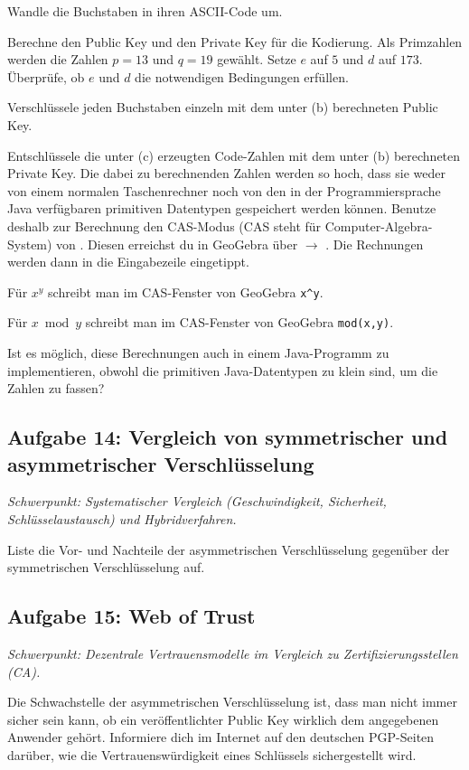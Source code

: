 \begin{compactenum}[a)]
\item Wandle die Buchstaben in ihren ASCII-Code um. 
\item Berechne den Public Key und den Private Key für die Kodierung. Als
Primzahlen werden die Zahlen $p=13$ und $q=19$ gewählt. Setze $e$ auf $5$ und $d$
auf $173$. Überprüfe, ob $e$ und $d$ die notwendigen Bedingungen erfüllen.
\item Verschlüssele jeden Buchstaben einzeln mit dem unter (b) berechneten Public
Key.
\item Entschlüssele die unter (c) erzeugten Code-Zahlen mit dem unter (b)
berechneten Private Key. Die dabei zu berechnenden Zahlen werden so hoch, dass
sie weder von einem normalen Taschenrechner noch von den in der
Programmiersprache Java verfügbaren primitiven Datentypen gespeichert werden
können. Benutze deshalb zur Berechnung den CAS-Modus (CAS steht für
Computer-Algebra-System) von . Diesen erreichst du in
GeoGebra über  $\rightarrow$ . Die
Rechnungen werden dann in die Eingabezeile eingetippt.

Für $x^y$ schreibt man im CAS-Fenster von GeoGebra \lstinline|x^y|.

Für $x \bmod y$ schreibt man im CAS-Fenster von GeoGebra \lstinline|mod(x,y)|.
\item Ist es möglich, diese Berechnungen auch in einem Java-Programm zu
implementieren, obwohl die primitiven Java-Datentypen zu klein sind, um die
Zahlen zu fassen?
\end{compactenum}


\subsection{Aufgabe 14: Vergleich von symmetrischer und asymmetrischer Verschlüsselung \tagGKWahl}
\noindent \emph{Schwerpunkt: Systematischer Vergleich (Geschwindigkeit, Sicherheit, Schlüsselaustausch) und Hybridverfahren.}

Liste die Vor- und Nachteile der asymmetrischen Verschlüsselung
gegenüber der symmetrischen Verschlüsselung auf.


\subsection{Aufgabe 15: Web of Trust \tagZusatz \tagGKWahl}
\noindent \emph{Schwerpunkt: Dezentrale Vertrauensmodelle im Vergleich zu Zertifizierungsstellen (CA).}

Die Schwachstelle der asymmetrischen Verschlüsselung ist, dass man nicht immer
sicher sein kann, ob ein veröffentlichter Public Key wirklich dem angegebenen
Anwender gehört. Informiere dich im Internet auf den deutschen PGP-Seiten
darüber, wie die Vertrauenswürdigkeit eines Schlüssels sichergestellt wird.
